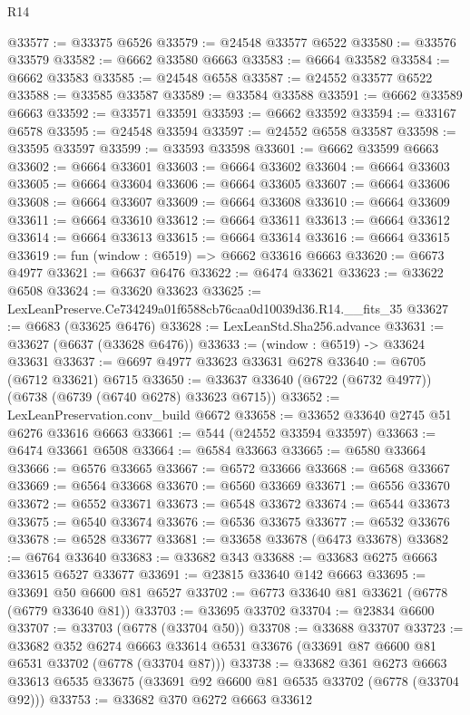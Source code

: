 \begin{lexlean}{R14}
\begin{coremodule}
@33577 := @33375 @6526
@33579 := @24548 @33577 @6522
@33580 := @33576 @33579
@33582 := @6662 @33580 @6663
@33583 := @6664 @33582
@33584 := @6662 @33583
@33585 := @24548 @6558
@33587 := @24552 @33577 @6522
@33588 := @33585 @33587
@33589 := @33584 @33588
@33591 := @6662 @33589 @6663
@33592 := @33571 @33591
@33593 := @6662 @33592
@33594 := @33167 @6578
@33595 := @24548 @33594
@33597 := @24552 @6558 @33587
@33598 := @33595 @33597
@33599 := @33593 @33598
@33601 := @6662 @33599 @6663
@33602 := @6664 @33601
@33603 := @6664 @33602
@33604 := @6664 @33603
@33605 := @6664 @33604
@33606 := @6664 @33605
@33607 := @6664 @33606
@33608 := @6664 @33607
@33609 := @6664 @33608
@33610 := @6664 @33609
@33611 := @6664 @33610
@33612 := @6664 @33611
@33613 := @6664 @33612
@33614 := @6664 @33613
@33615 := @6664 @33614
@33616 := @6664 @33615
@33619 := fun (window : @6519) => @6662 @33616 @6663
@33620 := @6673 @4977
@33621 := @6637 @6476
@33622 := @6474 @33621
@33623 := @33622 @6508
@33624 := @33620 @33623
@33625 := LexLeanPreserve.Ce734249a01f6588cb76caa0d10039d36.R14.__fits_35
@33627 := @6683 (@33625 @6476)
@33628 := LexLeanStd.Sha256.advance
@33631 := @33627 (@6637 (@33628 @6476))
@33633 := (window : @6519) -> @33624 @33631
@33637 := @6697 @4977 @33623 @33631 @6278
@33640 := @6705 (@6712 @33621) @6715
@33650 := @33637 @33640 (@6722 (@6732 @4977)) (@6738 (@6739 (@6740 @6278) @33623 @6715))
@33652 := LexLeanPreservation.conv_build @6672
@33658 := @33652 @33640 @2745 @51 @6276 @33616 @6663
@33661 := @544 (@24552 @33594 @33597)
@33663 := @6474 @33661 @6508
@33664 := @6584 @33663
@33665 := @6580 @33664
@33666 := @6576 @33665
@33667 := @6572 @33666
@33668 := @6568 @33667
@33669 := @6564 @33668
@33670 := @6560 @33669
@33671 := @6556 @33670
@33672 := @6552 @33671
@33673 := @6548 @33672
@33674 := @6544 @33673
@33675 := @6540 @33674
@33676 := @6536 @33675
@33677 := @6532 @33676
@33678 := @6528 @33677
@33681 := @33658 @33678 (@6473 @33678)
@33682 := @6764 @33640
@33683 := @33682 @343
@33688 := @33683 @6275 @6663 @33615 @6527 @33677
@33691 := @23815 @33640 @142 @6663
@33695 := @33691 @50 @6600 @81 @6527
@33702 := @6773 @33640 @81 @33621 (@6778 (@6779 @33640 @81))
@33703 := @33695 @33702
@33704 := @23834 @6600
@33707 := @33703 (@6778 (@33704 @50))
@33708 := @33688 @33707
@33723 := @33682
    @352
    @6274
    @6663
    @33614
    @6531
    @33676
    (@33691 @87 @6600 @81 @6531 @33702 (@6778 (@33704 @87)))
@33738 := @33682
    @361
    @6273
    @6663
    @33613
    @6535
    @33675
    (@33691 @92 @6600 @81 @6535 @33702 (@6778 (@33704 @92)))
@33753 := @33682
    @370
    @6272
    @6663
    @33612

\end{coremodule}
\end{lexlean}
